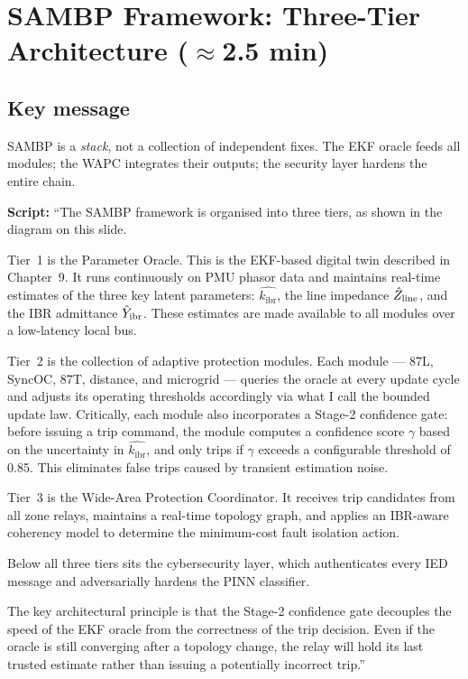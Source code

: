 \documentclass[11pt,a4paper]{article}
\newcommand{\script}[1]{\begin{scriptbox}\textbf{Script:} #1\end{scriptbox}}
\newcommand{\kibr}{k_{\mathrm{ibr}}}
\begin{document}
\section{SAMBP Framework: Three-Tier Architecture \hfill\normalfont\small($\approx$2.5 min)}
\label{slide:architecture}

\subsection*{Key message}
SAMBP is a \emph{stack}, not a collection of independent fixes. The EKF oracle feeds
all modules; the WAPC integrates their outputs; the security layer hardens the entire chain.

\script{%
``The SAMBP framework is organised into three tiers, as shown in the diagram on this
slide.

Tier~1 is the Parameter Oracle. This is the EKF-based digital twin described in
Chapter~9. It runs continuously on PMU phasor data and maintains real-time estimates of
the three key latent parameters: $\hat{\kibr}$, the line impedance $\hat{Z}_{\rm line}$,
and the IBR admittance $\hat{Y}_{\rm ibr}$. These estimates are made available to all
modules over a low-latency local bus.

Tier~2 is the collection of adaptive protection modules. Each module --- 87L, SyncOC,
87T, distance, and microgrid --- queries the oracle at every update cycle and adjusts its
operating thresholds accordingly via what I call the bounded update law. Critically, each
module also incorporates a Stage-2 confidence gate: before issuing a trip command, the
module computes a confidence score $\gamma$ based on the uncertainty in $\hat{\kibr}$,
and only trips if $\gamma$ exceeds a configurable threshold of 0.85. This eliminates
false trips caused by transient estimation noise.

Tier~3 is the Wide-Area Protection Coordinator. It receives trip candidates from all
zone relays, maintains a real-time topology graph, and applies an IBR-aware coherency
model to determine the minimum-cost fault isolation action.

Below all three tiers sits the cybersecurity layer, which authenticates every IED message
and adversarially hardens the PINN classifier.

The key architectural principle is that the Stage-2 confidence gate decouples the speed
of the EKF oracle from the correctness of the trip decision. Even if the oracle is still
converging after a topology change, the relay will hold its last trusted estimate rather
than issuing a potentially incorrect trip.''%
}
\end{document}
